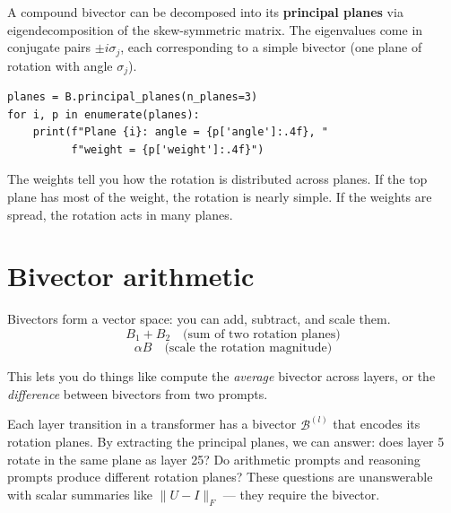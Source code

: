 \documentclass[11pt, twoside, openright]{memoir}
\newcommand{\bivec}[1]{\mathcal{B}^{(#1)}}  %
\begin{document}
A compound bivector can be decomposed into its \textbf{principal planes}
via eigendecomposition of the skew-symmetric matrix.  The eigenvalues
come in conjugate pairs $\pm i\sigma_j$, each corresponding to a simple
bivector (one plane of rotation with angle $\sigma_j$).

\begin{lstlisting}[caption={Extracting principal planes}]
planes = B.principal_planes(n_planes=3)
for i, p in enumerate(planes):
    print(f"Plane {i}: angle = {p['angle']:.4f}, "
          f"weight = {p['weight']:.4f}")
\end{lstlisting}

The weights tell you how the rotation is distributed across planes.
If the top plane has most of the weight, the rotation is nearly simple.
If the weights are spread, the rotation acts in many planes.

\section{Bivector arithmetic}

Bivectors form a vector space: you can add, subtract, and scale them.
\[
  B_1 + B_2 \quad \text{(sum of two rotation planes)}
\]
\[
  \alpha B \quad \text{(scale the rotation magnitude)}
\]

This lets you do things like compute the \emph{average} bivector across
layers, or the \emph{difference} between bivectors from two prompts.

\begin{transformer}
Each layer transition in a transformer has a bivector $\bivec{l}$ that
encodes its rotation planes.  By extracting the principal planes, we can
answer: does layer 5 rotate in the same plane as layer 25?  Do
arithmetic prompts and reasoning prompts produce different rotation
planes?  These questions are unanswerable with scalar summaries like
$\|U - I\|_F$ --- they require the bivector.
\end{transformer}
\end{document}
